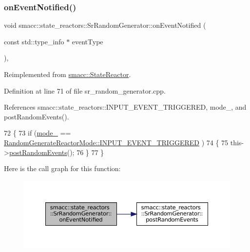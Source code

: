 \subsubsection{\texorpdfstring{on\+Event\+Notified()}{onEventNotified()}}
{\footnotesize\ttfamily void smacc\+::state\+\_\+reactors\+::\+Sr\+Random\+Generator\+::on\+Event\+Notified (\begin{DoxyParamCaption}\item[{const std\+::type\+\_\+info $\ast$}]{event\+Type }\end{DoxyParamCaption})\hspace{0.3cm}{\ttfamily [override]}, {\ttfamily [virtual]}}



Reimplemented from \hyperlink{classsmacc_1_1StateReactor_a17646b3c68a6d80d1e4da8c14238ce36}{smacc\+::\+State\+Reactor}.



Definition at line 71 of file sr\+\_\+random\+\_\+generator.\+cpp.



References smacc\+::state\+\_\+reactors\+::\+I\+N\+P\+U\+T\+\_\+\+E\+V\+E\+N\+T\+\_\+\+T\+R\+I\+G\+G\+E\+R\+ED, mode\+\_\+, and post\+Random\+Events().


\begin{DoxyCode}
72 \{
73     \textcolor{keywordflow}{if} (\hyperlink{classsmacc_1_1state__reactors_1_1SrRandomGenerator_a10984da2fb51badf4fe6f25861120735}{mode\_} == \hyperlink{namespacesmacc_1_1state__reactors_a038f8e362ad6d35494c940ee4c97a52eab75323a08fc093fa69e7a6aceb681611}{RandomGenerateReactorMode::INPUT\_EVENT\_TRIGGERED}
      )
74     \{
75         this->\hyperlink{classsmacc_1_1state__reactors_1_1SrRandomGenerator_a50638c93ca9444fbeecea6e72bc6ac35}{postRandomEvents}();
76     \}
77 \}
\end{DoxyCode}
Here is the call graph for this function\+:
\nopagebreak
\begin{figure}[H]
\begin{center}
\leavevmode
\includegraphics[width=350pt]{classsmacc_1_1state__reactors_1_1SrRandomGenerator_a8635347245b76d17355fe374e854144f_cgraph}
\end{center}
\end{figure}
\mbox{\label{classsmacc_1_1state__reactors_1_1SrRandomGenerator_a50638c93ca9444fbeecea6e72bc6ac35}} 
